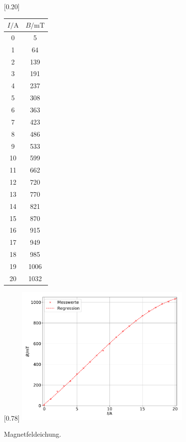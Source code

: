 \begin{figure}[p]
  \centering
  [0.20\textwidth]{
  \centering
  \begin{tabular}{c c}
    \toprule
    $I / \si{\ampere}$ & $B / \si{\milli\tesla}$ \\
    \midrule
    0 & 5 \\
    1 & 64 \\
    2 & 139 \\
    3 & 191 \\
    4 & 237 \\
    5 & 308 \\
    6 & 363 \\
    7 & 423 \\
    8 & 486 \\
    9 & 533 \\
    10 & 599 \\
    11 & 662 \\
    12 & 720 \\
    13 & 770 \\
    14 & 821 \\
    15 & 870 \\
    16 & 915 \\
    17 & 949 \\
    18 & 985 \\
    19 & 1006 \\
    20 & 1032 \\
    \bottomrule
  \end{tabular}
  }
  [0.78\textwidth]{
  \centering
  \includegraphics[width=0.78\textwidth]{B_Feld.pdf}
  }
  \caption{Magnetfeldeichung.}
  \label{A_Abb:1}
\end{figure}

